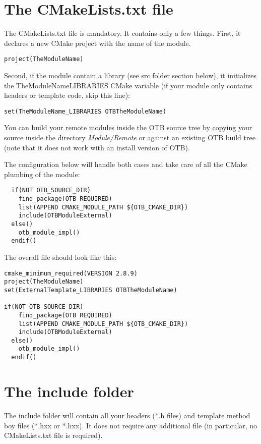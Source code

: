 \section{The CMakeLists.txt file}

The CMakeLists.txt file is mandatory. It contains only a few things.
First, it declares a new CMake project with the name of the module.

\begin{verbatim}
project(TheModuleName)
\end{verbatim}

Second, if the module contain a library (see src folder section below), it initializes the TheModuleName\textunderscore LIBRARIES CMake variable (if your module only contains headers or template code, skip this line):

\begin{verbatim}
set(TheModuleName_LIBRARIES OTBTheModuleName)
\end{verbatim}

You can build your remote modules inside the OTB source tree by copying your
source inside the directory \textit{Module/Remote} or against an existing OTB
build tree (note that it does not work with an install version of OTB).

The configuration below will handle both cases and take care of all the CMake
plumbing of the module:

\begin{verbatim}
  if(NOT OTB_SOURCE_DIR)
    find_package(OTB REQUIRED)
    list(APPEND CMAKE_MODULE_PATH ${OTB_CMAKE_DIR})
    include(OTBModuleExternal)
  else()
    otb_module_impl()
  endif()
\end{verbatim}

The overall file should look like this:

\begin{verbatim}
cmake_minimum_required(VERSION 2.8.9)
project(TheModuleName)
set(ExternalTemplate_LIBRARIES OTBTheModuleName)

if(NOT OTB_SOURCE_DIR)
    find_package(OTB REQUIRED)
    list(APPEND CMAKE_MODULE_PATH ${OTB_CMAKE_DIR})
    include(OTBModuleExternal)
  else()
    otb_module_impl()
  endif()
\end{verbatim}

\section{The include folder}

The include folder will contain all your headers (*.h files) and template method boy files (*.hxx or *.hxx). It does not require any additional file (in particular, no CMakeLists.txt file is required).

